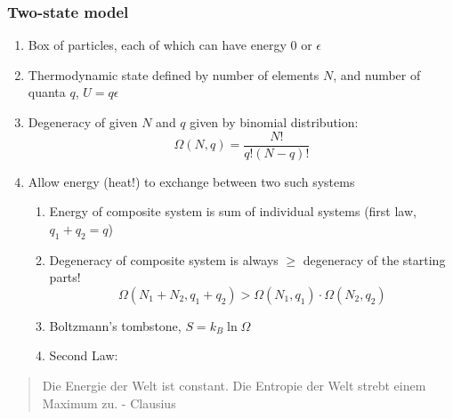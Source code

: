 \documentclass[11pt]{article}
\begin{document}
\subsubsection{Two-state model}
\label{sec:orgd64ed9f}
\begin{enumerate}
\item Box of particles, each of which can have energy 0 or \(\epsilon\)
\item Thermodynamic state defined by number of elements \(N\), and number of quanta \(q\), \(U=q\epsilon\)
\item Degeneracy of given \(N\) and \(q\) given by binomial distribution:
\begin{displaymath}
  \Omega(N,q)=\frac{N!}{q!(N-q)!}
\end{displaymath}
\item Allow energy (heat!) to exchange between two such systems
\begin{enumerate}
\item Energy of composite system is sum of individual systems (first law, \(q_1+q_2=q\))
\item Degeneracy of composite system is always \(\geq\) degeneracy of the starting parts!
\[\Omega(N_1+N_2,q_1+q_2) > \Omega(N_1,q_1)\cdot \Omega(N_2,q_2) \]
\item Boltzmann's tombstone, \(S = k_B \ln \Omega\)
\item Second Law:
\end{enumerate}
\end{enumerate}
\begin{quote}
Die Energie der Welt ist constant.  Die Entropie der Welt strebt einem Maximum zu. - Clausius
\end{quote}
\end{document}

